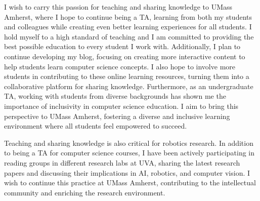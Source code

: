 \documentclass[10pt]{article}
\begin{document}
I wish to carry this passion for teaching and sharing knowledge to UMass Amherst, where I hope to continue being a TA, learning from both my students and colleagues while creating even better learning experiences for all students. I hold myself to a high standard of teaching and I am committed to providing the best possible education to every student I work with. Additionally, I plan to continue developing my blog, focusing on creating more interactive content to help students learn computer science concepts. I also hope to involve more students in contributing to these online learning resources, turning them into a collaborative platform for sharing knowledge. Furthermore, as an undergraduate TA, working with students from diverse backgrounds has shown me the importance of inclusivity in computer science education. I aim to bring this perspective to UMass Amherst, fostering a diverse and inclusive learning environment where all students feel empowered to succeed.

Teaching and sharing knowledge is also critical for robotics research. In addition to being a TA for computer science courses, I have been actively participating in reading groups in different research labs at UVA, sharing the latest research papers and discussing their implications in AI, robotics, and computer vision. I wish to continue this practice at UMass Amherst, contributing to the intellectual community and enriching the research environment.
\end{document}
